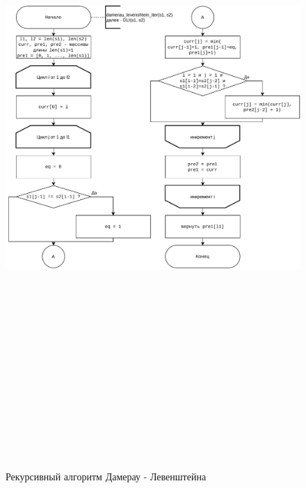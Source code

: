         \begin{figure}
            \centering
            \includegraphics[width=15cm,height=25cm,keepaspectratio]{images/dleven_iter.pdf}
            \caption{Рекурсивный алгоритм Дамерау - Левенштейна}
            \label{fig:dleven_iter}
        \end{figure}
    
    \clearpage
    

